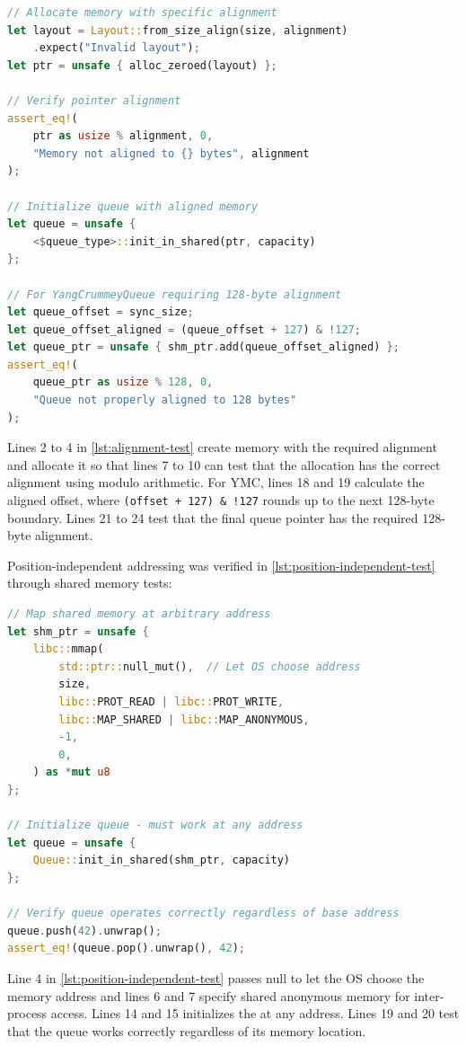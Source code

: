 \begin{lstlisting}[language=Rust, style=boxed, caption={Memory alignment verification test}, label={lst:alignment-test}]
// Allocate memory with specific alignment
let layout = Layout::from_size_align(size, alignment)
    .expect("Invalid layout");
let ptr = unsafe { alloc_zeroed(layout) };

// Verify pointer alignment
assert_eq!(
    ptr as usize % alignment, 0,
    "Memory not aligned to {} bytes", alignment
);

// Initialize queue with aligned memory
let queue = unsafe { 
    <$queue_type>::init_in_shared(ptr, capacity) 
};

// For YangCrummeyQueue requiring 128-byte alignment
let queue_offset = sync_size;
let queue_offset_aligned = (queue_offset + 127) & !127;
let queue_ptr = unsafe { shm_ptr.add(queue_offset_aligned) };
assert_eq!(
    queue_ptr as usize % 128, 0,
    "Queue not properly aligned to 128 bytes"
);
\end{lstlisting}

Lines 2 to 4 in \cref{lst:alignment-test} create memory with the required alignment and allocate it so that lines 7 to 10 can test that the allocation has the correct alignment using modulo arithmetic. For \ac{YMC}, lines 18 and 19 calculate the aligned offset, where \texttt{(offset + 127) \& !127} rounds up to the next 128-byte boundary. Lines 21 to 24 test that the final queue pointer has the required 128-byte alignment.

Position-independent addressing was verified in \cref{lst:position-independent-test} through shared memory tests:

\begin{lstlisting}[language=Rust, style=boxed, caption={Position-independent addressing test}, label={lst:position-independent-test}]
// Map shared memory at arbitrary address
let shm_ptr = unsafe { 
    libc::mmap(
        std::ptr::null_mut(),  // Let OS choose address
        size,
        libc::PROT_READ | libc::PROT_WRITE,
        libc::MAP_SHARED | libc::MAP_ANONYMOUS,
        -1,
        0,
    ) as *mut u8
};

// Initialize queue - must work at any address
let queue = unsafe { 
    Queue::init_in_shared(shm_ptr, capacity) 
};

// Verify queue operates correctly regardless of base address
queue.push(42).unwrap();
assert_eq!(queue.pop().unwrap(), 42);
\end{lstlisting}

Line 4 in \cref{lst:position-independent-test} passes null to let the OS choose the memory address and lines 6 and 7 specify shared anonymous memory for inter-process access. Lines 14 and 15 initializes the at any address. Lines 19 and 20 test that the queue works correctly regardless of its memory location.


